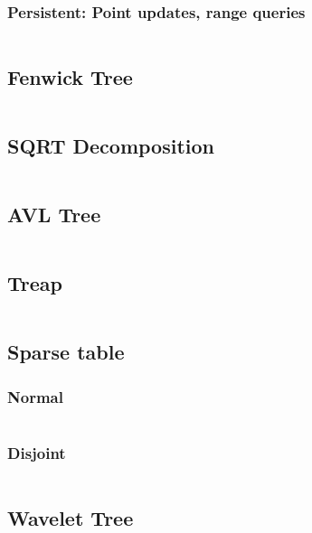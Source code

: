 \documentclass[11pt]{article}
\begin{document}
			\subsubsection{Persistent: Point updates, range queries}
			\inputminted[tabsize=2,breaklines,firstline=173,lastline=203,fontsize=\small]{c++}{queries.cpp}
		
		\subsection{Fenwick Tree}
		\inputminted[tabsize=2,breaklines,firstline=205,lastline=242,fontsize=\small]{c++}{queries.cpp}
		
		\subsection{SQRT Decomposition}
		\inputminted[tabsize=2,breaklines,firstline=244,lastline=322,fontsize=\small]{c++}{queries.cpp}
		
		\subsection{AVL Tree}
		\inputminted[tabsize=2,breaklines,firstline=324,lastline=529,fontsize=\small]{c++}{queries.cpp}
		
		\subsection{Treap}
		\inputminted[tabsize=2,breaklines,firstline=531,lastline=796,fontsize=\small]{c++}{queries.cpp}
		
		\subsection{Sparse table}
			\subsubsection{Normal}
			\inputminted[tabsize=2,breaklines,firstline=798,lastline=833,fontsize=\small]{c++}{queries.cpp}
		
			\subsubsection{Disjoint}
			\inputminted[tabsize=2,breaklines,firstline=835,lastline=868,fontsize=\small]{c++}{queries.cpp}
			
		\subsection{Wavelet Tree}
		\inputminted[tabsize=2,breaklines,firstline=870,lastline=933,fontsize=\small]{c++}{queries.cpp}
		
\end{document}
